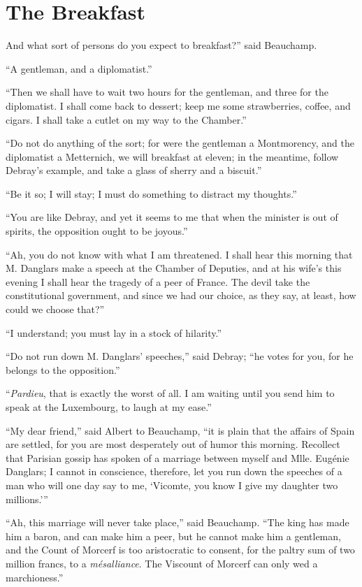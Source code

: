 \chapter{The Breakfast}

And what sort of persons do you expect to breakfast?” said Beauchamp.

“A gentleman, and a diplomatist.”

“Then we shall have to wait two hours for the gentleman, and three for
the diplomatist. I shall come back to dessert; keep me some
strawberries, coffee, and cigars. I shall take a cutlet on my way to
the Chamber.”

“Do not do anything of the sort; for were the gentleman a Montmorency,
and the diplomatist a Metternich, we will breakfast at eleven; in the
meantime, follow Debray’s example, and take a glass of sherry and a
biscuit.”

“Be it so; I will stay; I must do something to distract my thoughts.”

“You are like Debray, and yet it seems to me that when the minister is
out of spirits, the opposition ought to be joyous.”

“Ah, you do not know with what I am threatened. I shall hear this
morning that M. Danglars make a speech at the Chamber of Deputies, and
at his wife’s this evening I shall hear the tragedy of a peer of
France. The devil take the constitutional government, and since we had
our choice, as they say, at least, how could we choose that?”

“I understand; you must lay in a stock of hilarity.”

“Do not run down M. Danglars’ speeches,” said Debray; “he votes for
you, for he belongs to the opposition.”

“\textit{Pardieu}, that is exactly the worst of all. I am waiting until you
send him to speak at the Luxembourg, to laugh at my ease.”

“My dear friend,” said Albert to Beauchamp, “it is plain that the
affairs of Spain are settled, for you are most desperately out of humor
this morning. Recollect that Parisian gossip has spoken of a marriage
between myself and Mlle. Eugénie Danglars; I cannot in conscience,
therefore, let you run down the speeches of a man who will one day say
to me, ‘Vicomte, you know I give my daughter two millions.’”

“Ah, this marriage will never take place,” said Beauchamp. “The king
has made him a baron, and can make him a peer, but he cannot make him a
gentleman, and the Count of Morcerf is too aristocratic to consent, for
the paltry sum of two million francs, to a \textit{mésalliance}. The Viscount
of Morcerf can only wed a marchioness.”

